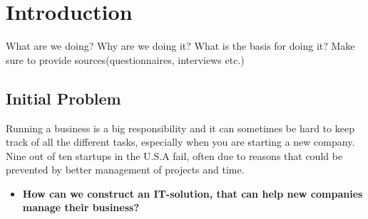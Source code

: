 \section{Introduction}
What are we doing?
Why are we doing it?
What is the basis for doing it?
Make sure to provide sources(questionnaires, interviews etc.)

\subsection{Initial Problem}
Running a business is a big responsibility and it can sometimes be hard to keep track of all the different tasks, especially when you are starting a new company. 
Nine out of ten startups in the U.S.A fail, often due to reasons that could be prevented by better management of projects and time\citep{fortune_start}.




\begin{itemize}
\item{\noindent\textbf{How can we construct an IT-solution, that can help new companies manage their business?}}
\end{itemize}
